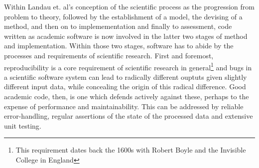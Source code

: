 Within Landau et. al's conception of the scientific process as the progression from problem to theory, followed by the establishment of a model, the devising of a method, and then on to implemementation and finally to assessment\cite{landau_survey_2011}, code written as academic software is now involved in the latter two stages of  method and implementation. Within those two stages, software has to abide by the processes and requirements of scientific research. First and foremost, reproducibility is a core requirement of scientific research in general\footnote{This requirement dates back the 1600s with Robert Boyle and the Invisible College in England\cite{leveque_reproducible_2012}} and bugs in a scientific software system can lead to radically different ouptuts given slightly different input data, while concealing the origin of this radical difference. Good academic code, then, is one which defends actively against these, perhaps to the expense of performance and maintainability. This can be addressed by reliable error-handling, regular assertions of the state of the processed data and extensive unit testing\cite{wilson_best_2014}.

